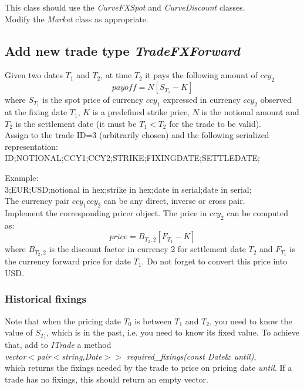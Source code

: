 \documentclass[10pt]{article}
\begin{document}
This class should use the \textit{CurveFXSpot} and \textit{CurveDiscount} classes.\\

Modify the \textit{Market} class as appropriate.

\subsection{Add new trade type \textit{TradeFXForward}}
Given two dates $T_1$ and $T_2$, at time $T_2$ it pays the following amount of $ccy_2$
$$
payoff=N[S_{T_1}-K]
$$
where $S_{T_1}$ is the spot price of currency $ccy_1$ expressed in currency $ccy_2$  observed at the fixing date $T_1$, $K$ is a predefined strike price, $N$ is the notional amount and $T_2$ is the settlement date (it must be $T_1<T_2$ for the trade to be valid).\\

Assign to the trade ID=3 (arbitrarily chosen) and the following serialized representation:\\
ID;NOTIONAL;CCY1;CCY2;STRIKE;FIXINGDATE;SETTLEDATE;

\noindent Example:\\
3;EUR;USD;notional in hex;strike in hex;date in serial;date in serial;\\

The currency pair $ccy_1ccy_2$ can be any direct, inverse or cross pair.\\

Implement the corresponding pricer object. The price in $ccy_2$ can be computed as:
$$
price=B_{T_2,2}[F_{T_1}-K]
$$
where $B_{T_2,2}$ is the discount factor in currency 2 for settlement date $T_2$ and $F_{T_1}$ is the currency forward price for date $T_1$. Do not forget to convert this price into USD.\\

\subsubsection{Historical fixings}
Note that when the pricing date $T_0$ is between $T_1$ and $T_2$, you need to know the value of $S_{T_1}$, which is in the past, i.e. you need to know its fixed value. To achieve that, add to \textit{ITrade} a method\\
\textit{vector$<$pair$<$string,Date$>>$ required\_fixings(const Date$\&$ until)},\\
which returns the fixings needed by the trade to price on pricing date \textit{until}. If a trade has no fixings, this should return an empty vector.
\end{document}
